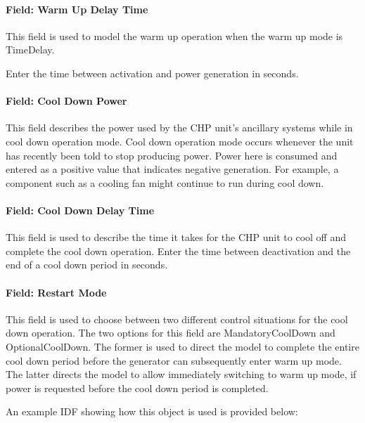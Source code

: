 \paragraph{Field: Warm Up Delay Time}\label{field-warm-up-delay-time}

This field is used to model the warm up operation when the warm up mode is TimeDelay.

Enter the time between activation and power generation in seconds.

\paragraph{Field: Cool Down Power}\label{field-cool-down-power}

This field describes the power used by the CHP unit's ancillary systems while in cool down operation mode. Cool down operation mode occurs whenever the unit has recently been told to stop producing power. Power here is consumed and entered as a positive value that indicates negative generation. For example, a component such as a cooling fan might continue to run during cool down.

\paragraph{Field: Cool Down Delay Time}\label{field-cool-down-delay-time}

This field is used to describe the time it takes for the CHP unit to cool off and complete the cool down operation. Enter the time between deactivation and the end of a cool down period in seconds.

\paragraph{Field: Restart Mode}\label{field-restart-mode}

This field is used to choose between two different control situations for the cool down operation. The two options for this field are MandatoryCoolDown and OptionalCoolDown. The former is used to direct the model to complete the entire cool down period before the generator can subsequently enter warm up mode. The latter directs the model to allow immediately switching to warm up mode, if power is requested before the cool down period is completed.

An example IDF showing how this object is used is provided below:

